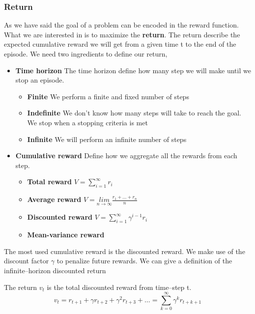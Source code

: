 \documentclass[../main.tex]{subfiles}
\begin{document}
\subsubsection{Return}
As we have said the goal of a problem can be encoded in the reward function. What we are interested in is to maximize the \textbf{return}. The return describe the expected cumulative reward we will get from a given time t to the end of the episode. We need two ingredients to define our return,
\begin{itemize}
    \item \textbf{Time horizon} The time horizon define how many step we will make until we stop an episode.
          \begin{itemize}
              \item \textbf{Finite} We perform a finite and fixed number of steps
              \item \textbf{Indefinite} We don't know how many steps will take to reach the goal. We stop when a stopping criteria is met
              \item \textbf{Infinite} We will perform an infinite number of steps
          \end{itemize}
    \item \textbf{Cumulative reward} Define how we aggregate all the rewards from each step.
          \begin{itemize}
              \item \textbf{Total reward} $V = \sum_{i=1}^{\infty} r_i$
              \item \textbf{Average reward} $V = \underset{n \rightarrow \infty}{lim} \frac{r_1 + \dots + r_n}{n}$
              \item \textbf{Discounted reward} $V = \sum_{i=1}^{\infty} \gamma^{i-1} r_i$
              \item \textbf{Mean-variance reward}
          \end{itemize}
\end{itemize}
The most used cumulative reward is the discounted reward. We make use of the discount factor $\gamma$ to penalize future rewards. We can give a definition of the infinite–horizon discounted return
\begin{definition}
    The return $v_t$ is the total discounted reward from time–step t.
    \begin{equation}
        v_t = r_{t+1} + \gamma r_{t+2} + \gamma^2 r_{t+3} + \dots = \sum_{k=0}^{\infty} \gamma^k r_{t+k+1}
    \end{equation}
\end{definition}
\end{document}
